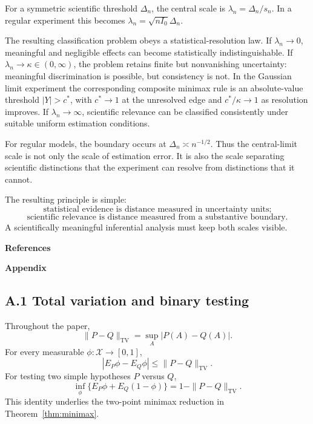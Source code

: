 \documentclass[11pt]{article}
\theoremstyle{remark}
\begin{document}
For a symmetric scientific threshold $\Delta_n$, the central scale is $\lambda_n=\Delta_n/s_n$. In a regular experiment this becomes $\lambda_n=\sqrt{nI_0}\Delta_n$.

The resulting classification problem obeys a statistical-resolution law. If $\lambda_n\to0$, meaningful and negligible effects can become statistically indistinguishable. If $\lambda_n\to\kappa\in(0,\infty)$, the problem retains finite but nonvanishing uncertainty: meaningful discrimination is possible, but consistency is not. In the Gaussian limit experiment the corresponding composite minimax rule is an absolute-value threshold $|Y|>c^*$, with $c^*\to1$ at the unresolved edge and $c^*/\kappa\to1$ as resolution improves. If $\lambda_n\to\infty$, scientific relevance can be classified consistently under suitable uniform estimation conditions.

For regular models, the boundary occurs at $\Delta_n\asymp n^{-1/2}$. Thus the central-limit scale is not only the scale of estimation error. It is also the scale separating scientific distinctions that the experiment can resolve from distinctions that it cannot.

The resulting principle is simple:
\[
\text{statistical evidence is distance measured in uncertainty units;}
\]
\[
\text{scientific relevance is distance measured from a substantive boundary.}
\]
A scientifically meaningful inferential analysis must keep both scales visible.

\clearpage
\begin{center}
{\Large\bfseries References}
\end{center}
\vspace{0.6em}
\printbibliography[heading=none]

\clearpage
\begin{center}
{\Large\bfseries Appendix}
\end{center}
\vspace{0.6em}

\subsection*{A.1 Total variation and binary testing}

Throughout the paper,
\[
\|P-Q\|_{\mathrm{TV}}=\sup_A|P(A)-Q(A)|.
\]
For every measurable $\phi:\mathcal X\to[0,1]$,
\[
|E_P\phi-E_Q\phi|\le\|P-Q\|_{\mathrm{TV}}.
\]
For testing two simple hypotheses $P$ versus $Q$,
\[
\inf_\phi\{E_P\phi+E_Q(1-\phi)\}
=
1-\|P-Q\|_{\mathrm{TV}}.
\]
This identity underlies the two-point minimax reduction in Theorem~\ref{thm:minimax}.
\end{document}
